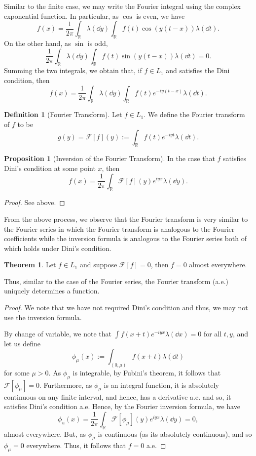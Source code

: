 \documentclass[]{article}
\theoremstyle{definition}
\newtheorem{theorem}{Theorem}
\theoremstyle{definition}
\newtheorem{definition}{Definition}[section]
\newtheorem{proposition}{Proposition}[section]
\begin{document}
Similar to the finite case, we may write the Fourier integral using the complex exponential
function. In particular, as \(\cos\) is even, we have 
\[f(x) = \frac{1}{2\pi} \int_{\mathbb{R}} \lambda(\dd y) \int_{\mathbb{R}} f(t) \cos(y(t - x)) \lambda(\dd t).\]
On the other hand, as \(\sin\) is odd,
\[\frac{1}{2\pi} \int_{\mathbb{R}} \lambda(\dd y) \int_{\mathbb{R}} f(t) \sin(y(t - x)) \lambda(\dd t) = 0.\]
Summing the two integrals, we obtain that, if \(f \in L_1\) and satisfies the 
Dini condition, then 
\[f(x) = \frac{1}{2\pi} \int_{\mathbb{R}} \lambda(\dd y)\int_{\mathbb{R}}f(t) e^{-iy(t - x)} \lambda(\dd t).\]

\begin{definition}[Fourier Transform]
  Let \(f \in L_1\). We define the Fourier transform of \(f\) to be 
  \[g(y) = \mathcal{F}[f](y) := \int_{\mathbb{R}}f(t) e^{-iyt} \lambda(\dd t).\]
\end{definition}

\begin{proposition}[Inversion of the Fourier Transform]
  In the case that \(f\) satisfies Dini's condition at some point \(x\), then 
  \[f(x) = \frac{1}{2\pi} \int_{\mathbb{R}} \mathcal{F}[f](y) e^{iyx} \lambda(\dd y).\]
\end{proposition}
\begin{proof}
  See above.
\end{proof}

From the above process, we observe that the Fourier transform is very similar to 
the Fourier series in which the Fourier transform is analogous to the Fourier 
coefficients while the inversion formula is analogous to the Fourier series 
both of which holds under Dini's condition.

\begin{theorem}
  Let \(f \in L_1\) and suppose \(\mathcal{F}[f] = 0\), then \(f = 0\) almost everywhere.
\end{theorem}
Thus, similar to the case of the Fourier series, the Fourier transform (a.e.) uniquely 
determines a function.

\begin{proof}
  We note that we have not required Dini's condition and thus, we may not use 
  the inversion formula. 

  By change of variable, we note that \(\int f(x + t)e^{-i yx} \lambda(\dd x) = 0\) 
  for all \(t, y\), and let us define 
  \[\phi_\mu(x) := \int_{(0, \mu)} f(x + t) \lambda(\dd t)\]
  for some \(\mu > 0\). As \(\phi_\mu\) is integrable, by Fubini's theorem, it 
  follows that \(\mathcal{F}[\phi_\mu] = 0\). Furthermore, as \(\phi_\mu\) is 
  an integral function, it is absolutely continuous on any finite interval, and hence, 
  has a derivative a.e. and so, it satisfies Dini's condition a.e. Hence, by the 
  Fourier inversion formula, we have 
  \[\phi_u(x) = \frac{1}{2\pi}\int_{\mathbb{R}} \mathcal{F}[\phi_\mu](y)e^{iyx} \lambda(\dd y) = 0,\]
  almost everywhere. But, as \(\phi_\mu\) is continuous (as its absolutely continuous), 
  and so \(\phi_\mu = 0\) everywhere. Thus, it follows that \(f = 0\) a.e.
\end{proof}
\end{document}
